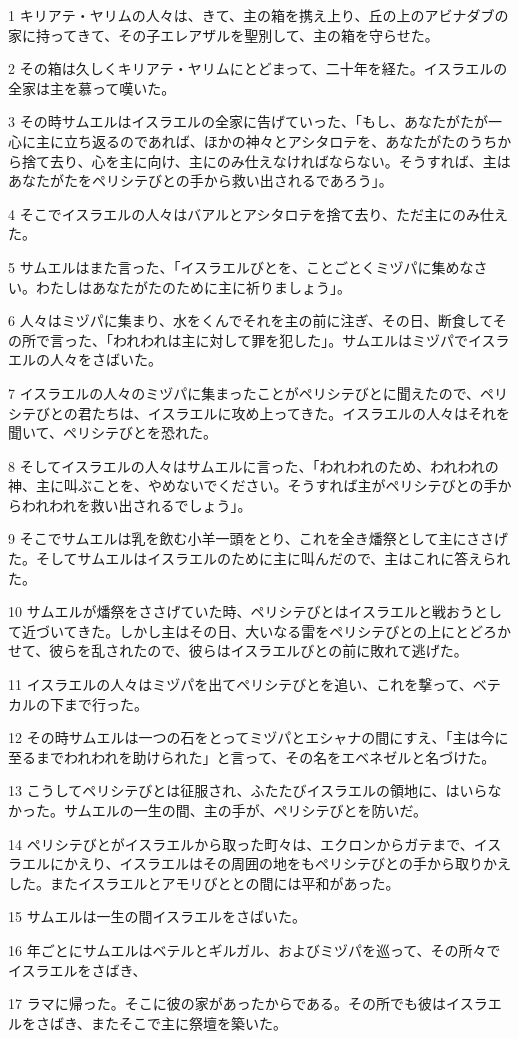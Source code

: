 \par 1 キリアテ・ヤリムの人々は、きて、主の箱を携え上り、丘の上のアビナダブの家に持ってきて、その子エレアザルを聖別して、主の箱を守らせた。
\par 2 その箱は久しくキリアテ・ヤリムにとどまって、二十年を経た。イスラエルの全家は主を慕って嘆いた。
\par 3 その時サムエルはイスラエルの全家に告げていった、「もし、あなたがたが一心に主に立ち返るのであれば、ほかの神々とアシタロテを、あなたがたのうちから捨て去り、心を主に向け、主にのみ仕えなければならない。そうすれば、主はあなたがたをペリシテびとの手から救い出されるであろう」。
\par 4 そこでイスラエルの人々はバアルとアシタロテを捨て去り、ただ主にのみ仕えた。
\par 5 サムエルはまた言った、「イスラエルびとを、ことごとくミヅパに集めなさい。わたしはあなたがたのために主に祈りましょう」。
\par 6 人々はミヅパに集まり、水をくんでそれを主の前に注ぎ、その日、断食してその所で言った、「われわれは主に対して罪を犯した」。サムエルはミヅパでイスラエルの人々をさばいた。
\par 7 イスラエルの人々のミヅパに集まったことがペリシテびとに聞えたので、ペリシテびとの君たちは、イスラエルに攻め上ってきた。イスラエルの人々はそれを聞いて、ペリシテびとを恐れた。
\par 8 そしてイスラエルの人々はサムエルに言った、「われわれのため、われわれの神、主に叫ぶことを、やめないでください。そうすれば主がペリシテびとの手からわれわれを救い出されるでしょう」。
\par 9 そこでサムエルは乳を飲む小羊一頭をとり、これを全き燔祭として主にささげた。そしてサムエルはイスラエルのために主に叫んだので、主はこれに答えられた。
\par 10 サムエルが燔祭をささげていた時、ペリシテびとはイスラエルと戦おうとして近づいてきた。しかし主はその日、大いなる雷をペリシテびとの上にとどろかせて、彼らを乱されたので、彼らはイスラエルびとの前に敗れて逃げた。
\par 11 イスラエルの人々はミヅパを出てペリシテびとを追い、これを撃って、ベテカルの下まで行った。
\par 12 その時サムエルは一つの石をとってミヅパとエシャナの間にすえ、「主は今に至るまでわれわれを助けられた」と言って、その名をエベネゼルと名づけた。
\par 13 こうしてペリシテびとは征服され、ふたたびイスラエルの領地に、はいらなかった。サムエルの一生の間、主の手が、ペリシテびとを防いだ。
\par 14 ペリシテびとがイスラエルから取った町々は、エクロンからガテまで、イスラエルにかえり、イスラエルはその周囲の地をもペリシテびとの手から取りかえした。またイスラエルとアモリびととの間には平和があった。
\par 15 サムエルは一生の間イスラエルをさばいた。
\par 16 年ごとにサムエルはベテルとギルガル、およびミヅパを巡って、その所々でイスラエルをさばき、
\par 17 ラマに帰った。そこに彼の家があったからである。その所でも彼はイスラエルをさばき、またそこで主に祭壇を築いた。

